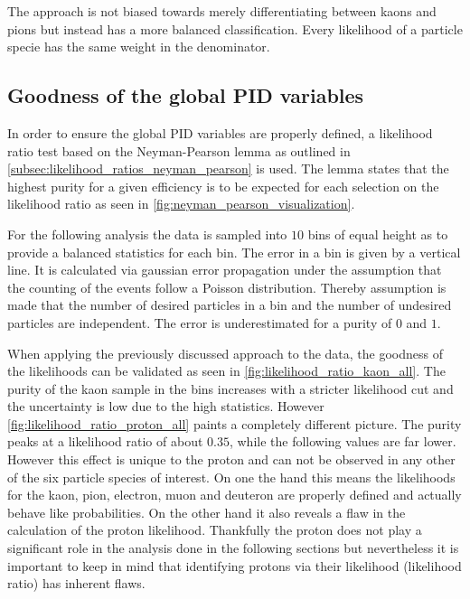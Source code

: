 The approach is not biased towards merely differentiating between kaons and pions but instead has a more balanced classification. Every likelihood of a particle specie has the same weight in the denominator.

\subsection{Goodness of the global PID variables}
\label{subsec:pid_variables_global_pid_goodness}

In order to ensure the global PID variables are properly defined, a likelihood ratio test based on the Neyman-Pearson lemma as outlined in \autoref{subsec:likelihood_ratios_neyman_pearson} is used. The lemma states that the highest purity for a given efficiency is to be expected for each selection on the likelihood ratio as seen in \autoref{fig:neyman_pearson_visualization}.

For the following analysis the data is sampled into $10$ bins of equal height as to provide a balanced statistics for each bin. The error in a bin is given by a vertical line. It is calculated via gaussian error propagation under the assumption that the counting of the events follow a Poisson distribution. Thereby assumption is made that the number of desired particles in a bin and the number of undesired particles are independent. The error is underestimated for a purity of $0$ and $1$.

When applying the previously discussed approach to the data, the goodness of the likelihoods can be validated as seen in \autoref{fig:likelihood_ratio_kaon_all}. The purity of the kaon sample in the bins increases with a stricter likelihood cut and the uncertainty is low due to the high statistics. However \autoref{fig:likelihood_ratio_proton_all} paints a completely different picture. The purity peaks at a likelihood ratio of about $0.35$, while the following values are far lower. However this effect is unique to the proton and can not be observed in any other of the six particle species of interest. On one the hand this means the likelihoods for the kaon, pion, electron, muon and deuteron are properly defined and actually behave like probabilities. On the other hand it also reveals a flaw in the calculation of the proton likelihood. Thankfully the proton does not play a significant role in the analysis done in the following sections but nevertheless it is important to keep in mind that identifying protons via their likelihood (likelihood ratio) has inherent flaws.

